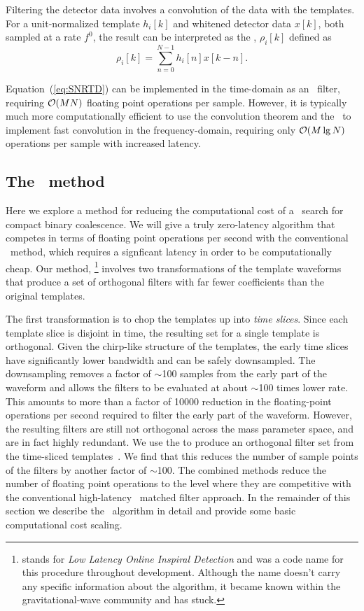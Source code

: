 Filtering the detector data involves a convolution of the data with the
templates.  For a unit-normalized template $h_i[k]$ and whitened detector data
$x[k]$, both sampled at a rate $f^0$, the result can be interpreted as the
\SNR{}, $\rho_i[k]$ defined as
%
%
\begin{equation}
	\label{eq:SNRTD}
	\rho_i [k] = \sum_{n=0}^{N-1} h_{i}[n] x [k-n].
\end{equation}

Equation~(\ref{eq:SNRTD}) can be implemented in the time-domain as an
\fir\ filter, requiring $\mathcal O(M N)$ floating point
operations per sample.  However, it is typically much more computationally
efficient to use the convolution theorem and the \fft\ to implement fast
convolution in the frequency-domain, requiring only $\mathcal O(M
\lg N)$ operations per sample with increased latency.


\subsection{The \lloid\ method}

Here we explore a method for reducing the computational cost of a \TD\ search
for compact binary coalescence.  We will give a truly zero-latency algorithm
that competes in terms of floating point operations per second with the
conventional \FD\ method, which requires a signficant latency in order to be
computationally cheap. Our method, \lloid{}\footnote{\lloid{} stands for
\emph{Low
Latency Online Inspiral Detection} and was a code name for this procedure
throughout development. Although the name doesn't carry any specific
information about the algorithm, it became known within the gravitational-wave
community and has stuck.}%
involves two transformations of the template waveforms that produce a set of
orthogonal filters with far fewer coefficients than the original templates.

The first transformation is to chop the \TD{} templates up into \emph{time
slices}.  Since each template slice is disjoint in time, the resulting set for
a single template is orthogonal.  Given the chirp-like structure of the
templates, the early time slices have significantly lower bandwidth and can be
safely downsampled.  The downsampling removes a factor of $\sim$100 samples
from the early part of the waveform and allows the filters to be evaluated at
about $\sim$100 times lower rate.  This amounts to more than a factor of 10000
reduction in the floating-point operations per second required to filter the
early part of the waveform.  However, the resulting filters are still not
orthogonal across the mass parameter space, and are in fact highly redundant.
We use the \SVD{} to produce an orthogonal filter set
from the time-sliced templates~\cite{Cannon:2010p10398}.  We find that this
reduces the number of sample points of the filters by another factor of
$\sim$100.  The combined methods reduce the number of floating point operations
to the level where they are competitive with the conventional high-latency \FD\
matched filter approach.  In the remainder of this section we describe the
\lloid\ algorithm in detail and provide some basic computational cost scaling.  

